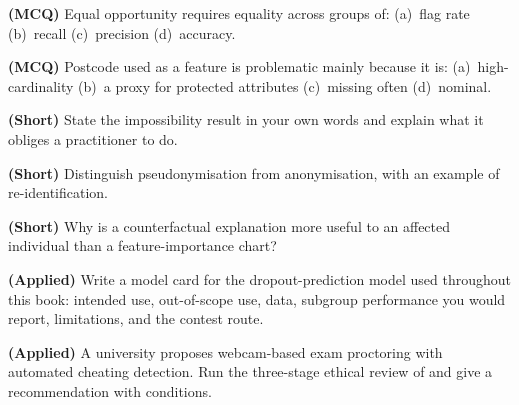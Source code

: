 \begin{reviewq}
  \item \textbf{(MCQ)} Equal opportunity requires equality across groups of:
        (a)~flag rate (b)~recall (c)~precision (d)~accuracy.
  \item \textbf{(MCQ)} Postcode used as a feature is problematic mainly because it is:
        (a)~high-cardinality (b)~a proxy for protected attributes (c)~missing often
        (d)~nominal.
  \item \textbf{(Short)} State the impossibility result in your own words and explain
        what it obliges a practitioner to do.
  \item \textbf{(Short)} Distinguish pseudonymisation from anonymisation, with an
        example of re-identification.
  \item \textbf{(Short)} Why is a counterfactual explanation more useful to an
        affected individual than a feature-importance chart?
  \item \textbf{(Applied)} Write a model card for the dropout-prediction model used
        throughout this book: intended use, out-of-scope use, data, subgroup
        performance you would report, limitations, and the contest route.
  \item \textbf{(Applied)} A university proposes webcam-based exam proctoring with
        automated cheating detection. Run the three-stage ethical review of
         and give a recommendation with conditions.
\end{reviewq}
